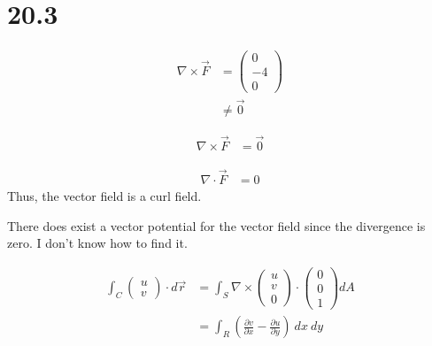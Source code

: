 \documentclass[8pt]{extarticle}
\begin{document}
  \section{20.3}%
  \begin{description}[font=\normalfont]
    \item[4:]
      \begin{align*}
        \nabla\times\vec{F} &= \begin{pmatrix}0\\-4\\0\end{pmatrix}\\
                            &\neq \vec{0}
      \end{align*}
    \item[6:]
      \begin{align*}
        \nabla\times\vec{F} &= \vec{0}
      \end{align*}
    \item[8:]
      \begin{align*}
        \nabla\cdot \vec{F} &= 0
      \end{align*}
      Thus, the vector field is a curl field.
    \item[24:] There does exist a vector potential for the vector field since the divergence is zero. I don't know how to find it.
    \item[28:]
      \begin{align*}
        \int_{C} \begin{pmatrix}u\\v\end{pmatrix}\cdot d\vec{r} &= \int_{S} \nabla\times\begin{pmatrix}u\\v\\0\end{pmatrix}\cdot \begin{pmatrix}0\\0\\1\end{pmatrix}dA\\
                                                                &= \int_{R}\left(\frac{\partial v}{\partial x} - \frac{\partial u}{\partial y}\right)~dx~dy
      \end{align*}
  \end{description}
\end{document}
